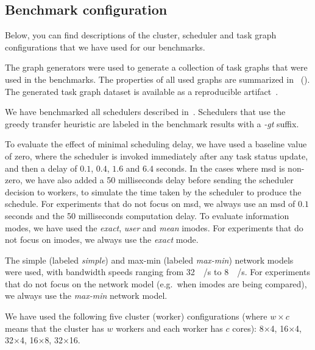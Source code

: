 \subsection{Benchmark configuration}
Below, you can find descriptions of the cluster, scheduler and task graph configurations that we
have used for our benchmarks.

\begin{description}[wide=0pt,itemsep=0pt,topsep=4pt]
	\item[Task graphs] The \estee{} graph generators were used to generate a collection of task graphs that
		were used in the benchmarks. The properties of all used graphs are summarized
		in~ (). The generated task graph dataset is available as a reproducible
		artifact~\cite{estee_graphs}.
	\item[Schedulers] We have benchmarked all schedulers described in~. Schedulers that use the
		greedy transfer heuristic are labeled in the benchmark results with a \emph{-gt}
		suffix.
	\item[Scheduler parameters] To evaluate the effect of minimal scheduling delay, we have used a baseline value of zero, where
		the scheduler is invoked immediately after any task status update, and then a delay of
		$0.1$, $0.4$, $1.6$ and $6.4$
		seconds. In the cases where \gls{msd} is non-zero, we have also added a
	\num{50} milliseconds delay before sending the scheduler decision to workers, to
		simulate the time taken by the scheduler to produce the schedule. For experiments that do not focus
		on \gls{msd}, we always use an \gls{msd} of $0.1$ seconds
		and the \num{50} milliseconds computation delay. To evaluate information modes, we
		have used the \emph{exact}, \emph{user} and \emph{mean} imodes. For
		experiments that do not focus on imodes, we always use the \emph{exact} mode.
	\item[Network models] The simple (labeled \emph{simple}) and max-min (labeled \emph{max-min}) network
		models were used, with bandwidth speeds ranging from \SI{32}{\mebi\byte}/s to
		\SI{8}{\gibi\byte}/s. For experiments that do not focus on the network model (e.g.\ when imodes
		are being compared), we always use the \emph{max-min} network model.
	\item[Clusters] We have used the following five cluster (worker) configurations (where $w \times c$ means
		that the cluster has $w$ workers and each worker has $c$
		cores):  8$\times$4, 16$\times$4, 32$\times$4,
		16$\times$8, 32$\times$16.
\end{description}

